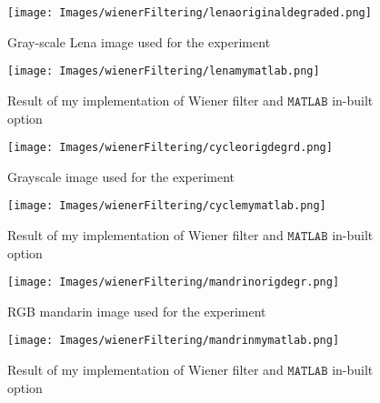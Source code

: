 \documentclass[a4paper]{book}
\begin{document}
\begin{figure}[H]		
	\begin{center}
		\texttt{[image: Images/wienerFiltering/lenaoriginaldegraded.png]}
		\caption{Gray-scale Lena image used for the experiment}
		\label{fig3.2}
	\end{center}
\end{figure}

\begin{figure}[H]		
	\begin{center}
		\texttt{[image: Images/wienerFiltering/lenamymatlab.png]}	
			\caption{Result of my implementation of Wiener filter and $ \mathtt{MATLAB} $ in-built option}
			\label{fig3.3}
	\end{center}		
\end{figure}

\begin{figure}[H]		
	\begin{center}
		\texttt{[image: Images/wienerFiltering/cycleorigdegrd.png]}
		\caption{Grayscale image used for the experiment}
		\label{fig3.4}
	\end{center}
\end{figure}
\begin{figure}[H]		
	\begin{center}
		\texttt{[image: Images/wienerFiltering/cyclemymatlab.png]}	
		\caption{Result of my implementation of Wiener filter and $ \mathtt{MATLAB} $ in-built option}
		\label{fig3.5}
	\end{center}
\end{figure}

\begin{figure}[H]		
	\begin{center}
		\texttt{[image: Images/wienerFiltering/mandrinorigdegr.png]}
		\caption{RGB mandarin image used for the experiment}
		\label{fig3.6}
	\end{center}
\end{figure}


\begin{figure}[H]		
	\centering
	\texttt{[image: Images/wienerFiltering/mandrinmymatlab.png]}	
	\caption{Result of my implementation of Wiener filter and $ \mathtt{MATLAB} $ in-built option}
	\label{fig3.7}
\end{figure}
\newpage
\end{document}
